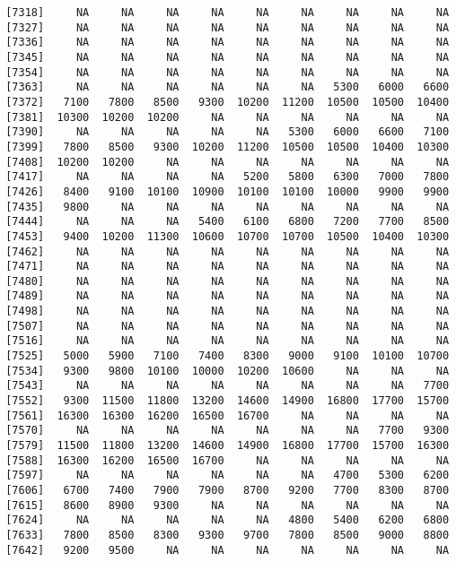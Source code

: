 \documentclass[]{article}
\begin{document}
\begin{verbatim}
 [7318]     NA     NA     NA     NA     NA     NA     NA     NA     NA
 [7327]     NA     NA     NA     NA     NA     NA     NA     NA     NA
 [7336]     NA     NA     NA     NA     NA     NA     NA     NA     NA
 [7345]     NA     NA     NA     NA     NA     NA     NA     NA     NA
 [7354]     NA     NA     NA     NA     NA     NA     NA     NA     NA
 [7363]     NA     NA     NA     NA     NA     NA   5300   6000   6600
 [7372]   7100   7800   8500   9300  10200  11200  10500  10500  10400
 [7381]  10300  10200  10200     NA     NA     NA     NA     NA     NA
 [7390]     NA     NA     NA     NA     NA   5300   6000   6600   7100
 [7399]   7800   8500   9300  10200  11200  10500  10500  10400  10300
 [7408]  10200  10200     NA     NA     NA     NA     NA     NA     NA
 [7417]     NA     NA     NA     NA   5200   5800   6300   7000   7800
 [7426]   8400   9100  10100  10900  10100  10100  10000   9900   9900
 [7435]   9800     NA     NA     NA     NA     NA     NA     NA     NA
 [7444]     NA     NA     NA   5400   6100   6800   7200   7700   8500
 [7453]   9400  10200  11300  10600  10700  10700  10500  10400  10300
 [7462]     NA     NA     NA     NA     NA     NA     NA     NA     NA
 [7471]     NA     NA     NA     NA     NA     NA     NA     NA     NA
 [7480]     NA     NA     NA     NA     NA     NA     NA     NA     NA
 [7489]     NA     NA     NA     NA     NA     NA     NA     NA     NA
 [7498]     NA     NA     NA     NA     NA     NA     NA     NA     NA
 [7507]     NA     NA     NA     NA     NA     NA     NA     NA     NA
 [7516]     NA     NA     NA     NA     NA     NA     NA     NA     NA
 [7525]   5000   5900   7100   7400   8300   9000   9100  10100  10700
 [7534]   9300   9800  10100  10000  10200  10600     NA     NA     NA
 [7543]     NA     NA     NA     NA     NA     NA     NA     NA   7700
 [7552]   9300  11500  11800  13200  14600  14900  16800  17700  15700
 [7561]  16300  16300  16200  16500  16700     NA     NA     NA     NA
 [7570]     NA     NA     NA     NA     NA     NA     NA   7700   9300
 [7579]  11500  11800  13200  14600  14900  16800  17700  15700  16300
 [7588]  16300  16200  16500  16700     NA     NA     NA     NA     NA
 [7597]     NA     NA     NA     NA     NA     NA   4700   5300   6200
 [7606]   6700   7400   7900   7900   8700   9200   7700   8300   8700
 [7615]   8600   8900   9300     NA     NA     NA     NA     NA     NA
 [7624]     NA     NA     NA     NA     NA   4800   5400   6200   6800
 [7633]   7800   8500   8300   9300   9700   7800   8500   9000   8800
 [7642]   9200   9500     NA     NA     NA     NA     NA     NA     NA

\end{verbatim}
\end{document}
